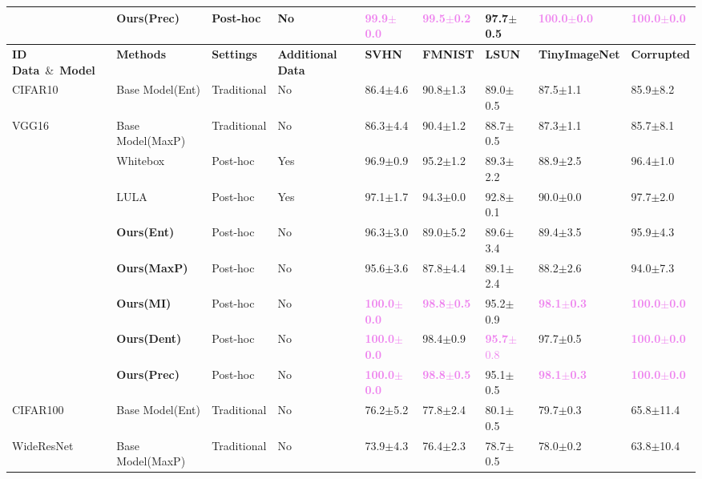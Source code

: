 \begin{table}[t]
\begin{center}
\begin{tabular}{lllllllll}
              & \textbf{Ours(Prec)} & Post-hoc & No & \textcolor{violet}{\textbf{99.9}$\pm$0.0} & \textcolor{violet}{\textbf{99.5}$\pm$0.2} &97.7$\pm$0.5 &  \textcolor{violet}{\textbf{100.0}$\pm$0.0} & \textcolor{violet}{\textbf{100.0}$\pm$0.0} \\
    \toprule
    \textbf{ID Data}\ \&\ \textbf{Model} & \textbf{Methods} & \textbf{Settings} & \textbf{Additional Data} & \textbf{SVHN}& \textbf{FMNIST} & \textbf{LSUN}& \textbf{TinyImageNet} &\textbf{Corrupted} \\
    \hline
    CIFAR10 & Base Model(Ent) & Traditional & No & 86.4$\pm$4.6 & 90.8$\pm$1.3 & 89.0$\pm$0.5 & 87.5$\pm$1.1 & 85.9$\pm$8.2  \\
    VGG16   & Base Model(MaxP) & Traditional & No & 86.3$\pm$4.4 & 90.4$\pm$1.2 & 88.7$\pm$0.5 & 87.3$\pm$1.1 & 85.7$\pm$8.1   \\
              & Whitebox & Post-hoc & Yes & 96.9$\pm$0.9 & 95.2$\pm$1.2 & 89.3$\pm$2.2 & 88.9$\pm$2.5 & 96.4$\pm$1.0   \\
              & LULA & Post-hoc & Yes & 97.1$\pm$1.7 & 94.3$\pm$0.0 & 92.8$\pm$0.1 & 90.0$\pm$0.0 & 97.7$\pm$2.0  \\
    \hline
              & \textbf{Ours(Ent)} & Post-hoc & No & 96.3$\pm$3.0 &89.0$\pm$5.2 & 89.6$\pm$3.4 &  89.4$\pm$3.5& 95.9$\pm$4.3 \\
              & \textbf{Ours(MaxP)} & Post-hoc & No & 95.6$\pm$3.6 & 87.8$\pm$4.4 &89.1$\pm$2.4 &  88.2$\pm$2.6 & 94.0$\pm$7.3 \\
              & \textbf{Ours(MI)} & Post-hoc & No & \textcolor{violet}{\textbf{100.0$\pm$0.0}} & \textcolor{violet}{\textbf{98.8$\pm$0.5}} & 95.2$\pm$0.9 &  \textcolor{violet}{\textbf{98.1$\pm$0.3}} & \textcolor{violet}{\textbf{100.0$\pm$0.0}} \\
              & \textbf{Ours(Dent)} & Post-hoc & No & \textcolor{violet}{\textbf{100.0$\pm$0.0}} & 98.4$\pm$0.9 & \textcolor{violet}{\textbf{95.7}$\pm$0.8} &  97.7$\pm$0.5 & \textcolor{violet}{\textbf{100.0$\pm$0.0}} \\
               & \textbf{Ours(Prec)} & Post-hoc & No & \textcolor{violet}{\textbf{100.0$\pm$0.0}} & \textcolor{violet}{\textbf{98.8$\pm$0.5}} & 95.1$\pm$0.5 &  \textcolor{violet}{\textbf{98.1$\pm$0.3}} & \textcolor{violet}{\textbf{100.0$\pm$0.0}} \\
    \toprule
    CIFAR100 & Base Model(Ent) & Traditional & No & 76.2$\pm$5.2 & 77.8$\pm$2.4 & 80.1$\pm$0.5 & 79.7$\pm$0.3 & 65.8$\pm$11.4  \\
    WideResNet   & Base Model(MaxP) & Traditional & No & 73.9$\pm$4.3 & 76.4$\pm$2.3 & 78.7$\pm$0.5 & 78.0$\pm$0.2 & 63.8$\pm$10.4   \\

\end{tabular}
\end{center}
\end{table}
